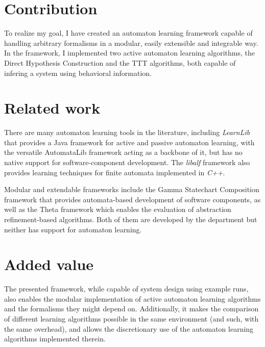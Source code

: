 \section{Contribution}

To realize my goal, I have created an automaton learning framework capable of handling arbitrary formalisms in a modular, easily extensible and integrable way. In the framework, I implemented two active automaton learning algorithms, the Direct Hypothesis Construction\cite{10.1007/978-3-642-34781-8_19} and the TTT\cite{10.1007/978-3-319-11164-3_26} algorithms, both capable of infering a system using behavioral information.

\section{Related work}



There are many automaton learning tools in the literature, including
\emph{LearnLib}\cite{10.1007/978-3-319-21690-4_32} that provides a Java framework for active and passive automaton learning, with the versatile AutomataLib framework acting as a backbone of it, but has no native support for software-component development. The \emph{libalf} framework also provides learning techniques for finite automata implemented in \emph{C++}. 

Modular and extendable frameworks include the Gamma Statechart Composition framework\cite{DBLP:conf/icse/MolnarGVMV18} that provides automata-based development of software components, as well as the Theta framework\cite{theta-fmcad2017} which enables the evaluation of abstraction refinement-based algorithms. Both of them are developed by the department but neither has support for automaton learning.

\section{Added value}

The presented framework, while capable of system design using example runs, also enables the modular implementation of active automaton learning algorithms and the formalisms they might depend on. Additionally, it makes the comparison of different learning algorithms possible in the same environment (and such, with the same overhead), and allows the discretionary use of the automaton learning algorithms implemented therein.

